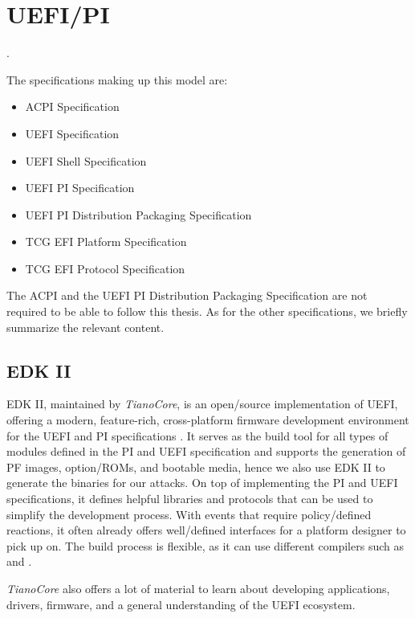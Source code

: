 
\chapter{\acs{UEFI}/\acs{PI}}
\label{sec:uefi-pi}

.

The specifications making up this model are:

\begin{itemize}
    \item \acs{ACPI} Specification
    \item \acs{UEFI} Specification
    \item \acs{UEFI} Shell Specification
    \item \acs{UEFI} \acs{PI} Specification
    \item \acs{UEFI} \acs{PI} Distribution Packaging Specification
    \item \acs{TCG} \acs{EFI} Platform Specification
    \item \acs{TCG} \acs{EFI} Protocol Specification
\end{itemize}

The \ac{ACPI} and the \ac{UEFI} \ac{PI} Distribution Packaging Specification are not required to be able to follow this thesis.
As for the other specifications, we briefly summarize the relevant content.


\clearpage


\clearpage


\clearpage


\section{\acs{EDK} II}

\ac{EDK} II, maintained by \emph{TianoCore}, is an open\-/source implementation of \ac{UEFI}, offering a modern, feature-rich, cross-platform firmware development environment for the \ac{UEFI} and \ac{PI} specifications \cite{tianocore}.
It serves as the build tool for all types of modules defined in the \ac{PI} and \ac{UEFI} specification and supports the generation of \ac{PF} images, option\-/\acp{ROM}, and bootable media, hence we also use \ac{EDK} II to generate the binaries for our attacks.
On top of implementing the \ac{PI} and \ac{UEFI} specifications, it defines helpful libraries and protocols that can be used to simplify the development process.
With events that require policy\-/defined reactions, it often already offers well\-/defined interfaces for a platform designer to pick up on.
The build process is flexible, as it can use different compilers such as  and .

\emph{TianoCore} also offers a lot of material to learn about developing applications, drivers, firmware, and a general understanding of the \ac{UEFI} ecosystem.